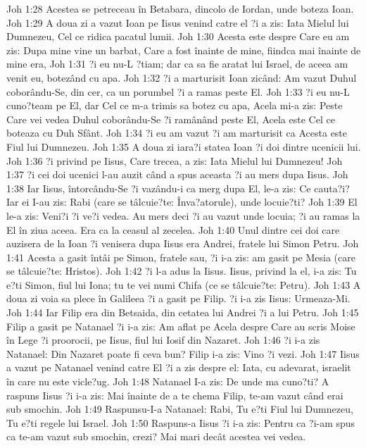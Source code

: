Joh 1:28  Acestea se petreceau în Betabara, dincolo de Iordan, unde boteza Ioan.
Joh 1:29  A doua zi a vazut Ioan pe Iisus venind catre el ?i a zis: Iata Mielul lui Dumnezeu, Cel ce ridica pacatul lumii.
Joh 1:30  Acesta este despre Care eu am zis: Dupa mine vine un barbat, Care a fost înainte de mine, fiindca mai înainte de mine era,
Joh 1:31  ?i eu nu-L ?tiam; dar ca sa fie aratat lui Israel, de aceea am venit eu, botezând cu apa.
Joh 1:32  ?i a marturisit Ioan zicând: Am vazut Duhul coborându-Se, din cer, ca un porumbel ?i a ramas peste El.
Joh 1:33  ?i eu nu-L cuno?team pe El, dar Cel ce m-a trimis sa botez cu apa, Acela mi-a zis: Peste Care vei vedea Duhul coborându-Se ?i ramânând peste El, Acela este Cel ce boteaza cu Duh Sfânt.
Joh 1:34  ?i eu am vazut ?i am marturisit ca Acesta este Fiul lui Dumnezeu.
Joh 1:35  A doua zi iara?i statea Ioan ?i doi dintre ucenicii lui.
Joh 1:36  ?i privind pe Iisus, Care trecea, a zis: Iata Mielul lui Dumnezeu!
Joh 1:37  ?i cei doi ucenici l-au auzit când a spus aceasta ?i au mers dupa Iisus.
Joh 1:38  Iar Iisus, întorcându-Se ?i vazându-i ca merg dupa El, le-a zis: Ce cauta?i? Iar ei I-au zis: Rabi (care se tâlcuie?te: Înva?atorule), unde locuie?ti?
Joh 1:39  El le-a zis: Veni?i ?i ve?i vedea. Au mers deci ?i au vazut unde locuia; ?i au ramas la El în ziua aceea. Era ca la ceasul al zecelea.
Joh 1:40  Unul dintre cei doi care auzisera de la Ioan ?i venisera dupa Iisus era Andrei, fratele lui Simon Petru.
Joh 1:41  Acesta a gasit întâi pe Simon, fratele sau, ?i i-a zis: am gasit pe Mesia (care se tâlcuie?te: Hristos).
Joh 1:42  ?i l-a adus la Iisus. Iisus, privind la el, i-a zis: Tu e?ti Simon, fiul lui Iona; tu te vei numi Chifa (ce se tâlcuie?te: Petru).
Joh 1:43  A doua zi voia sa plece în Galileea ?i a gasit pe Filip. ?i i-a zis Iisus: Urmeaza-Mi.
Joh 1:44  Iar Filip era din Betsaida, din cetatea lui Andrei ?i a lui Petru.
Joh 1:45  Filip a gasit pe Natanael ?i i-a zis: Am aflat pe Acela despre Care au scris Moise în Lege ?i proorocii, pe Iisus, fiul lui Iosif din Nazaret.
Joh 1:46  ?i i-a zis Natanael: Din Nazaret poate fi ceva bun? Filip i-a zis: Vino ?i vezi.
Joh 1:47  Iisus a vazut pe Natanael venind catre El ?i a zis despre el: Iata, cu adevarat, israelit în care nu este vicle?ug.
Joh 1:48  Natanael I-a zis: De unde ma cuno?ti? A raspuns Iisus ?i i-a zis: Mai înainte de a te chema Filip, te-am vazut când erai sub smochin.
Joh 1:49  Raspunsu-I-a Natanael: Rabi, Tu e?ti Fiul lui Dumnezeu, Tu e?ti regele lui Israel.
Joh 1:50  Raspuns-a Iisus ?i i-a zis: Pentru ca ?i-am spus ca te-am vazut sub smochin, crezi? Mai mari decât acestea vei vedea.
